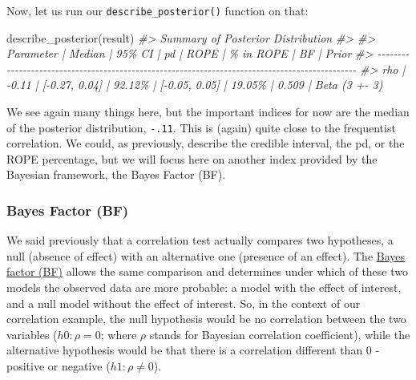 \documentclass[10pt,a4paper,onecolumn]{article}
\newenvironment{Shaded}{\begin{snugshade}}{\end{snugshade}}
\newcommand{\CommentTok}[1]{\textcolor[rgb]{0.56,0.35,0.01}{\textit{#1}}}
\newcommand{\FunctionTok}[1]{\textcolor[rgb]{0.00,0.00,0.00}{#1}}
\newcommand{\NormalTok}[1]{#1}
\newcommand{\OtherTok}[1]{\textcolor[rgb]{0.56,0.35,0.01}{#1}}
\newcommand{\SpecialCharTok}[1]{\textcolor[rgb]{0.00,0.00,0.00}{#1}}
\begin{document}
\begin{Shaded}
\end{Shaded}

Now, let us run our \texttt{describe\_posterior()} function on that:

\begin{Shaded}
\begin{Highlighting}[]
\FunctionTok{describe\_posterior}\NormalTok{(result)}
\CommentTok{\#\textgreater{} Summary of Posterior Distribution}
\CommentTok{\#\textgreater{} }
\CommentTok{\#\textgreater{} Parameter | Median |        95\% CI |     pd |          ROPE | \% in ROPE |    BF |         Prior}
\CommentTok{\#\textgreater{} {-}{-}{-}{-}{-}{-}{-}{-}{-}{-}{-}{-}{-}{-}{-}{-}{-}{-}{-}{-}{-}{-}{-}{-}{-}{-}{-}{-}{-}{-}{-}{-}{-}{-}{-}{-}{-}{-}{-}{-}{-}{-}{-}{-}{-}{-}{-}{-}{-}{-}{-}{-}{-}{-}{-}{-}{-}{-}{-}{-}{-}{-}{-}{-}{-}{-}{-}{-}{-}{-}{-}{-}{-}{-}{-}{-}{-}{-}{-}{-}{-}{-}{-}{-}{-}{-}{-}{-}{-}{-}{-}{-}{-}{-}{-}}
\CommentTok{\#\textgreater{} rho       |  {-}0.11 | [{-}0.27, 0.04] | 92.12\% | [{-}0.05, 0.05] |    19.05\% | 0.509 | Beta (3 +{-} 3)}
\end{Highlighting}
\end{Shaded}

We see again many things here, but the important indices for now are the
median of the posterior distribution, \texttt{-.11}. This is (again)
quite close to the frequentist correlation. We could, as previously,
describe the credible interval, the pd, or the ROPE percentage, but we
will focus here on another index provided by the Bayesian framework, the
Bayes Factor (BF).

\hypertarget{bayes-factor-bf}{%
\subsubsection{Bayes Factor (BF)}\label{bayes-factor-bf}}

We said previously that a correlation test actually compares two
hypotheses, a null (absence of effect) with an alternative one (presence
of an effect). The
\href{https://easystats.github.io/bayestestR/articles/bayes_factors.html}{Bayes
factor (BF)} allows the same comparison and determines under which of
these two models the observed data are more probable: a model with the
effect of interest, and a null model without the effect of interest. So,
in the context of our correlation example, the null hypothesis would be
no correlation between the two variables (\(h0: \rho = 0\); where
\(\rho\) stands for Bayesian correlation coefficient), while the
alternative hypothesis would be that there is a correlation different
than 0 - positive or negative (\(h1: \rho \neq 0\)).
\end{document}
